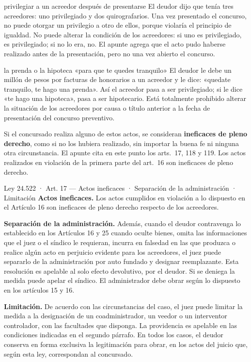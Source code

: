 \documentclass[12pt,oneside]{book}
\begin{document}
\begin{example}{privilegiar a un acreedor después de presentarse}
El deudor dijo que tenía tres acreedores: uno privilegiado y dos quirografarios. Una vez presentado el concurso, no puede otorgar un privilegio a otro de ellos, porque violaría el principio de igualdad. No puede alterar la condición de los acreedores: si uno es privilegiado, es privilegiado; si no lo era, no. %
El apunte agrega que el acto pudo haberse realizado antes de la presentación, pero no una vez abierto el concurso.
\end{example}

\begin{example}{la prenda o la hipoteca «para que te quedes tranquilo»}
El deudor le debe un millón de pesos por facturas de honorarios a un acreedor y le dice: «quedate tranquilo, te hago una prenda». Así el acreedor pasa a ser privilegiado; si le dice «te hago una hipoteca», pasa a ser hipotecario. Está totalmente prohibido alterar la situación de los acreedores por causa o título anterior a la fecha de presentación del concurso preventivo.
\end{example}

Si el concursado realiza alguno de estos actos, se consideran \textbf{ineficaces de pleno derecho}, como si no los hubiera realizado, sin importar la buena fe ni ninguna otra circunstancia. El apunte cita en este punto los arts.~17, 118 y 119. Los actos realizados en violación de la primera parte del art.~16 son ineficaces de pleno derecho.

\begin{norma}{Ley 24.522 · Art. 17 — Actos ineficaces · Separación de la administración · Limitación}
\textbf{Actos ineficaces.} Los actos cumplidos en violación a lo dispuesto en el Artículo 16 son ineficaces de pleno derecho respecto de los acreedores.

\textbf{Separación de la administración.} Además, cuando el deudor contravenga lo establecido en los Artículos 16 y 25 cuando oculte bienes, omita las informaciones que el juez o el síndico le requieran, incurra en falsedad en las que produzca o realice algún acto en perjuicio evidente para los acreedores, el juez puede separarlo de la administración por auto fundado y designar reemplazante. Esta resolución es apelable al solo efecto devolutivo, por el deudor. Si se deniega la medida puede apelar el síndico. El administrador debe obrar según lo dispuesto en los artículos 15 y 16.

\textbf{Limitación.} De acuerdo con las circunstancias del caso, el juez puede limitar la medida a la designación de un coadministrador, un veedor o un interventor controlador, con las facultades que disponga. La providencia es apelable en las condiciones indicadas en el segundo párrafo. En todos los casos, el deudor conserva en forma exclusiva la legitimación para obrar, en los actos del juicio que, según esta ley, correspondan al concursado.
\end{norma}
\end{document}
